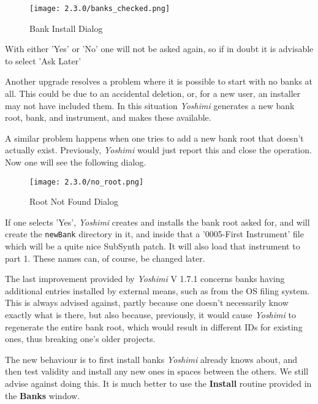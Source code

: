 \begin{figure}[H]
   \centering
   \texttt{[image: 2.3.0/banks\_checked.png]}
   \caption{Bank Install Dialog}
   \label{fig:bank_install_dialog}
\end{figure}

   With either 'Yes' or 'No' one will not be asked again, so if in doubt it is
   advisable to select 'Ask Later'

   Another upgrade resolves a problem where it is possible to start with no banks
   at all. This could be due to an accidental deletion, or, for a new user, an
   installer may not have included them. In this situation
   \textsl{Yoshimi} generates a new bank root, bank, and instrument,
   and makes these available.

   A similar problem happens when one tries to add a new bank root that doesn't
   actually exist. Previously, \textsl{Yoshimi} would just report this and close
   the operation. Now one will see the following dialog.

\begin{figure}[H]
   \centering
   \texttt{[image: 2.3.0/no\_root.png]}
   \caption{Root Not Found Dialog}
   \label{fig:no_root_dialog}
\end{figure}

   If one selects 'Yes', \textsl{Yoshimi} creates and installs the bank root
   asked for, and will create the \texttt{newBank} directory
   in it, and inside that a '0005-First Instrument' file which will be a quite
   nice SubSynth patch. It will also load that instrument to part 1.
   These names can, of course, be changed later.

   The last improvement provided by \textsl{Yoshimi} V 1.7.1 concerns banks
   having additional entries installed by external means, such as from the OS
   filing system. This is always advised against, partly because one doesn't
   necessarily know exactly what is there, but also because, previously, it would
   cause \textsl{Yoshimi} to regenerate the entire bank root,
   which would result in different IDs for existing ones, thus breaking one's
   older projects.

   The new behaviour is to first install banks \textsl{Yoshimi} already knows
   about, and then test validity and install any new ones in spaces between the
   others. We still advise against doing this. It is much better to use the
   \textbf{Install} routine provided in the \textbf{Banks} window.

